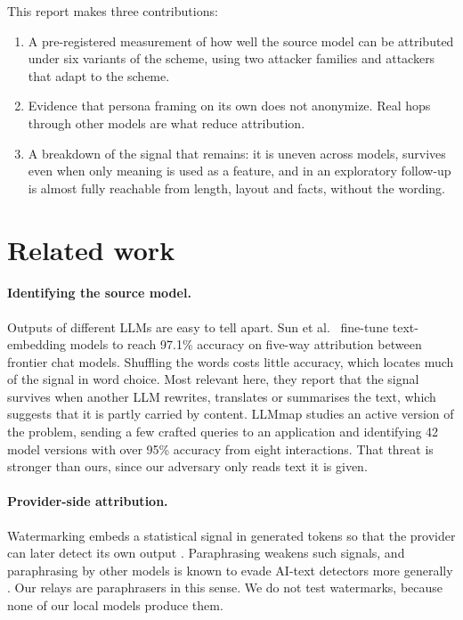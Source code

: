 \documentclass[11pt]{article}
\begin{document}
\noindent This report makes three contributions:
\begin{enumerate}
  \item A pre-registered measurement of how well the source model can be attributed under six variants of the scheme, using two attacker families and attackers that adapt to the scheme.
  \item Evidence that persona framing on its own does not anonymize. Real hops through other models are what reduce attribution.
  \item A breakdown of the signal that remains: it is uneven across models, survives even when only meaning is used as a feature, and in an exploratory follow-up is almost fully reachable from length, layout and facts, without the wording.
\end{enumerate}

\section{Related work}
\label{sec:related}

\paragraph{Identifying the source model.} Outputs of different LLMs are easy to tell apart. Sun et al.\ \cite{idiosyncrasies} fine-tune text-embedding models to reach 97.1\% accuracy on five-way attribution between frontier chat models. Shuffling the words costs little accuracy, which locates much of the signal in word choice. Most relevant here, they report that the signal survives when another LLM rewrites, translates or summarises the text, which suggests that it is partly carried by content. LLMmap \cite{llmmap} studies an active version of the problem, sending a few crafted queries to an application and identifying 42 model versions with over 95\% accuracy from eight interactions. That threat is stronger than ours, since our adversary only reads text it is given.

\paragraph{Provider-side attribution.} Watermarking embeds a statistical signal in generated tokens so that the provider can later detect its own output \cite{watermark}. Paraphrasing weakens such signals, and paraphrasing by other models is known to evade AI-text detectors more generally \cite{dipper,sadasivan}. Our relays are paraphrasers in this sense. We do not test watermarks, because none of our local models produce them.
\end{document}
